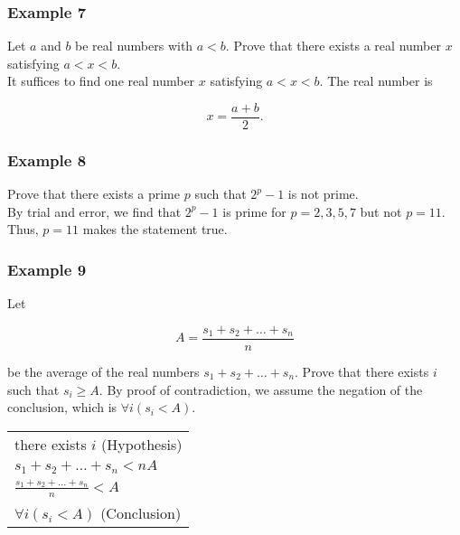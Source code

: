 \subsubsection*{Example 7}

Let $a$ and $b$ be real numbers with $a < b$.  Prove that there exists a real number $x$ satisfying $a < x < b$.\\

It suffices to find one real number $x$ satisfying $a < x < b$.  The real number is

\[
    x = \frac{a + b}{2}.
\]

\subsubsection*{Example 8}

Prove that there exists a prime $p$ such that $2^p - 1$ is not prime.\\

By trial and error, we find that $2^p - 1$ is prime for $p = 2, 3, 5, 7$ but not $p = 11$.  Thus, $p = 11$ makes the statement true.

\subsubsection*{Example 9}

Let

\[
    A = \frac{s_1 + s_2 + \dots + s_n}{n}
\]

be the average of the real numbers $s_1 + s_2 + \dots + s_n$.  Prove that there exists $i$ such that $s_i \geq A$.  By proof of contradiction, we assume the negation of the conclusion, which is $\forall i (s_i < A)$.

\begin{table}[h]
\centering
\begin{tabular}{l}
there exists $i$ (Hypothesis)\\
$s_1 + s_2 + \dots + s_n < nA$\\
$\frac{s_1 + s_2 + \dots + s_n}{n} < A$\\
$\forall i (s_i < A)$ (Conclusion)
\end{tabular}
\end{table}